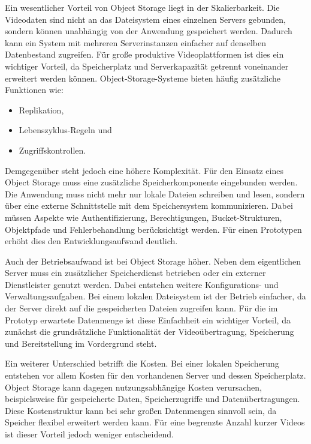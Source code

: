 Ein wesentlicher Vorteil von Object Storage liegt in der Skalierbarkeit. Die Videodaten sind nicht an das Dateisystem eines einzelnen Servers gebunden, sondern können unabhängig von der Anwendung gespeichert werden.
Dadurch kann ein System mit mehreren Serverinstanzen einfacher auf denselben Datenbestand zugreifen. Für große produktive Videoplattformen ist dies ein wichtiger Vorteil, da Speicherplatz und Serverkapazität getrennt voneinander erweitert werden können. 
Object-Storage-Systeme bieten häufig zusätzliche Funktionen wie: 

\begin{itemize} 
    \item Replikation, 
    \item Lebenszyklus-Regeln und 
    \item Zugriffskontrollen. 
\end{itemize}

Demgegenüber steht jedoch eine höhere Komplexität. Für den Einsatz eines Object Storage muss eine zusätzliche Speicherkomponente eingebunden werden. Die Anwendung muss nicht mehr nur lokale Dateien schreiben und lesen, sondern über eine externe Schnittstelle mit dem Speichersystem kommunizieren. 
Dabei müssen Aspekte wie Authentifizierung, Berechtigungen, Bucket-Strukturen, Objektpfade und Fehlerbehandlung berücksichtigt werden. Für einen Prototypen erhöht dies den Entwicklungsaufwand deutlich. 

Auch der Betriebsaufwand ist bei Object Storage höher. Neben dem eigentlichen Server muss ein zusätzlicher Speicherdienst betrieben oder ein externer Dienstleister genutzt werden. Dabei entstehen weitere Konfigurations- und Verwaltungsaufgaben. Bei einem lokalen Dateisystem ist der Betrieb einfacher, 
da der Server direkt auf die gespeicherten Dateien zugreifen kann. Für die im Prototyp erwartete Datenmenge ist diese Einfachheit ein wichtiger Vorteil, da zunächst die grundsätzliche Funktionalität der Videoübertragung, Speicherung und Bereitstellung im Vordergrund steht. 

Ein weiterer Unterschied betrifft die Kosten. Bei einer lokalen Speicherung entstehen vor allem Kosten für den vorhandenen Server und dessen Speicherplatz. Object Storage kann dagegen nutzungsabhängige Kosten verursachen, beispielsweise für gespeicherte Daten, Speicherzugriffe und Datenübertragungen. 
Diese Kostenstruktur kann bei sehr großen Datenmengen sinnvoll sein, da Speicher flexibel erweitert werden kann. Für eine begrenzte Anzahl kurzer Videos ist dieser Vorteil jedoch weniger entscheidend. 

